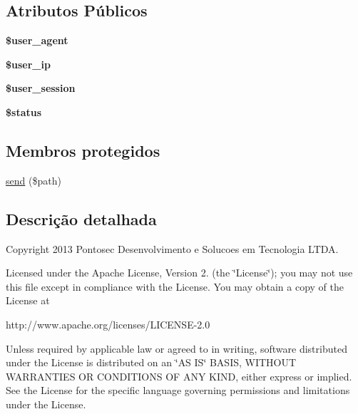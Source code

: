 \subsection*{Atributos Públicos}
\begin{DoxyCompactItemize}
\item 
\hypertarget{classPontopassAuth_a0a9de8521dadf8685bada54e995ad20f}{{\bfseries \$user\-\_\-agent}}\label{classPontopassAuth_a0a9de8521dadf8685bada54e995ad20f}

\item 
\hypertarget{classPontopassAuth_a8a71e97ba12b485685c568611d57c3c1}{{\bfseries \$user\-\_\-ip}}\label{classPontopassAuth_a8a71e97ba12b485685c568611d57c3c1}

\item 
\hypertarget{classPontopassAuth_acd34f947211dd0b266514ffb890d22cc}{{\bfseries \$user\-\_\-session}}\label{classPontopassAuth_acd34f947211dd0b266514ffb890d22cc}

\item 
\hypertarget{classPontopassAuth_a2f106279a0a3f00389172729c38031e1}{{\bfseries \$status}}\label{classPontopassAuth_a2f106279a0a3f00389172729c38031e1}

\end{DoxyCompactItemize}
\subsection*{Membros protegidos}
\begin{DoxyCompactItemize}
\item 
\hyperlink{classPontopassAuth_a85e61ad96f17e7c4fc9aec5d2124428b}{send} (\$path)
\end{DoxyCompactItemize}


\subsection{Descrição detalhada}
Copyright 2013 Pontosec Desenvolvimento e Solucoes em Tecnologia L\-T\-D\-A.

Licensed under the Apache License, Version 2. (the \char`\"{}\-License\char`\"{}); you may not use this file except in compliance with the License. You may obtain a copy of the License at \begin{DoxyVerb}http://www.apache.org/licenses/LICENSE-2.0
\end{DoxyVerb}


Unless required by applicable law or agreed to in writing, software distributed under the License is distributed on an \char`\"{}\-A\-S I\-S\char`\"{} B\-A\-S\-I\-S, W\-I\-T\-H\-O\-U\-T W\-A\-R\-R\-A\-N\-T\-I\-E\-S O\-R C\-O\-N\-D\-I\-T\-I\-O\-N\-S O\-F A\-N\-Y K\-I\-N\-D, either express or implied. See the License for the specific language governing permissions and limitations under the License.


